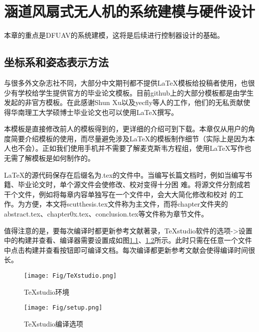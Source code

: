 \chapter{涵道风扇式无人机的系统建模与硬件设计}

本章的重点是DFUAV的系统建模，这将是后续进行控制器设计的基础。

\section{坐标系和姿态表示方法}


与很多外文杂志社不同，大部分中文期刊都不提供\LaTeX{}模板给投稿者使用，也很少有学校给学生提供官方的毕业论文模板。目前github上的大部分模板都是由学生发起的非官方模板。在此感谢Shun Xu以及yecfly等人的工作，他们的无私贡献使得华南理工大学硕博士毕业论文也可以使用\LaTeX{}撰写。

本模板是直接修改前人的模板得到的，更详细的介绍可到\parencite{_,_a}下载。本章仅从用户的角度简要介绍模板的使用，而尽量避免涉及\LaTeX{}的模板制作细节（实际上是因为本人也不会）。正如我们使用手机并不需要了解麦克斯韦方程组，使用\LaTeX{}写作也无需了解模板是如何制作的。

\LaTeX{}的源代码保存在后缀名为.tex的文件中。当编写长篇文档时，例如当编写书籍、毕业论文时，单个源文件会使修改、校对变得十分困
难。将源文件分割成若干个文件，例如将每章内容单独写在一个文件中，会大大简化修改和校对
的工作。为方便，本文将scutthesis.tex文件称为主文件，而将chapter文件夹的abstract.tex、chapter0x.tex、conclusion.tex等文件称为章节文件。

值得注意的是，要每次编译时都更新参考文献著录，TeXstudio软件的选项->设置中的构建并查看、编译器需要设置成如图\ref{TeXstudio}、\ref{setup}所示。此时只需在任意一个文件中点击构建并查看按钮即可编译文档。每次编译都更新参考文献会使得编译时间很长。
\begin{figure}[htbp]
	\centering
	\texttt{[image: Fig/TeXstudio.png]}
	\caption{\label{TeXstudio}TeXstudio环境}
\end{figure}
\begin{figure}[htbp]
	\centering
	\texttt{[image: Fig/setup.png]}
	\caption{\label{setup}TeXstudio编译选项}
\end{figure}

